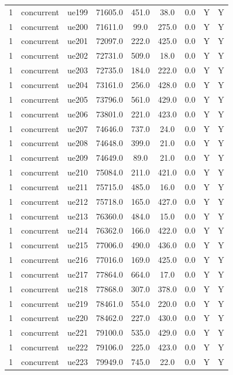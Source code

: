 \begin{table}[ht]
\begin{tabular}{|c|c|c|c|c|c|c|c|c|}
1 & concurrent & ue199 & 71605.0 & 451.0 & 38.0 & 0.0 & Y & Y \\
1 & concurrent & ue200 & 71611.0 & 99.0 & 275.0 & 0.0 & Y & Y \\
1 & concurrent & ue201 & 72097.0 & 222.0 & 425.0 & 0.0 & Y & Y \\
1 & concurrent & ue202 & 72731.0 & 509.0 & 18.0 & 0.0 & Y & Y \\
1 & concurrent & ue203 & 72735.0 & 184.0 & 222.0 & 0.0 & Y & Y \\
1 & concurrent & ue204 & 73161.0 & 256.0 & 428.0 & 0.0 & Y & Y \\
1 & concurrent & ue205 & 73796.0 & 561.0 & 429.0 & 0.0 & Y & Y \\
1 & concurrent & ue206 & 73801.0 & 221.0 & 423.0 & 0.0 & Y & Y \\
1 & concurrent & ue207 & 74646.0 & 737.0 & 24.0 & 0.0 & Y & Y \\
1 & concurrent & ue208 & 74648.0 & 399.0 & 21.0 & 0.0 & Y & Y \\
1 & concurrent & ue209 & 74649.0 & 89.0 & 21.0 & 0.0 & Y & Y \\
1 & concurrent & ue210 & 75084.0 & 211.0 & 421.0 & 0.0 & Y & Y \\
1 & concurrent & ue211 & 75715.0 & 485.0 & 16.0 & 0.0 & Y & Y \\
1 & concurrent & ue212 & 75718.0 & 165.0 & 427.0 & 0.0 & Y & Y \\
1 & concurrent & ue213 & 76360.0 & 484.0 & 15.0 & 0.0 & Y & Y \\
1 & concurrent & ue214 & 76362.0 & 166.0 & 422.0 & 0.0 & Y & Y \\
1 & concurrent & ue215 & 77006.0 & 490.0 & 436.0 & 0.0 & Y & Y \\
1 & concurrent & ue216 & 77016.0 & 169.0 & 425.0 & 0.0 & Y & Y \\
1 & concurrent & ue217 & 77864.0 & 664.0 & 17.0 & 0.0 & Y & Y \\
1 & concurrent & ue218 & 77868.0 & 307.0 & 378.0 & 0.0 & Y & Y \\
1 & concurrent & ue219 & 78461.0 & 554.0 & 220.0 & 0.0 & Y & Y \\
1 & concurrent & ue220 & 78462.0 & 227.0 & 430.0 & 0.0 & Y & Y \\
1 & concurrent & ue221 & 79100.0 & 535.0 & 429.0 & 0.0 & Y & Y \\
1 & concurrent & ue222 & 79106.0 & 225.0 & 423.0 & 0.0 & Y & Y \\
1 & concurrent & ue223 & 79949.0 & 745.0 & 22.0 & 0.0 & Y & Y \\

\end{tabular}
\end{table}
